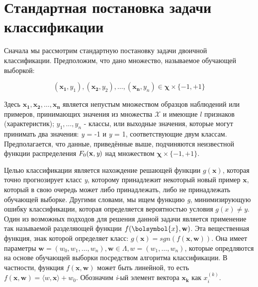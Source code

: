 \documentclass[12pt,a4paper,oneside]{article}
\begin{document}
\section{Стандартная постановка задачи классификации}
\label{sec:standard_classification_problem}


\par
Сначала мы рассмотрим стандартную постановку задачи двоичной классификации.
Предположим, что дано множество, называемое обучающей выборкой:

\[
(\mathbf{x_1}, y_1),(\mathbf{x_2}, y_2), \dots, (\mathbf{x_n}, y_n) \in \mathbf{\chi} \times \{-1,+1\}
\]


\par
Здесь \(\mathbf{x_1}, \mathbf{x_2}, \dots, \mathbf{x_n}\) является непустым множеством образцов наблюдений или примеров, принимающих значения из множества \(\mathcal{X}\) и имеющие $l$ признаков (характеристик); \(y_1, \dots, y_n\) - классы, или выходные значения, которые могут принимать два значения: \emph{y} = -1 и \emph{y} = 1, соответствующие двум классам. 
Предполагается, что данные, приведённые выше, подчиняются неизвестной функции распределения \(F_0(\mathbf{x}, \emph{y})\) над множеством \(\mathbf{\chi} \times \{-1, +1\}\). 


\par
Целью классификации является нахождение решающей функции \(g(\mathbf{x})\), которая точно прогнозирует класс \emph{y}, которому принадлежит некоторый новый пример \(\mathbf{x}\), который в свою очередь может либо принадлежать, либо не принадлежать обучающей выборке. 
Другими словами, мы ищем функцию \emph{g}, минимизирующую ошибку классификации, которая определяется вероятностью условия \(g(x) \neq y\). 
Один из возможных подходов для решения данной задачи является применение так называемой разделяющей функции \(f(\bolsymbol{x}, \mathbf{w})\). 
Эта вещественная функция, знак которой определяет класс: \(g(\mathbf{x})=sgn(f(\mathbf{x}, \mathbf{w}))\).
Она имеет параметры \(\mathbf{w}=(w_0, w_1, \dots, w_n), \mathbf{w} \in \Lambda, w = (w_1, \dots, w_n)\), которые опредляются на основе обучающей выборки посредством алгоритма классификации. 
В частности, функция \(f(\mathbf{x}, \mathbf{w})\) может быть линейной, то есть \(f(\mathbf{x}, \mathbf{w}) = \langle w, \mathbf{x} \rangle + w_0\). 
Обозначим \emph{i}-ый элемент вектора \(\mathbf{x_k}\) как \(x_i^{(k)}\). 
\end{document}
